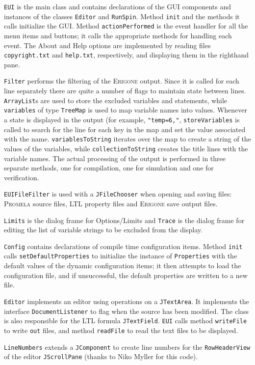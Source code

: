 \documentclass[11pt]{article}
\newcommand{\eri}{\textsc{Erigone}}
\newcommand{\prm}{\textsc{Promela}}
\newcommand{\p}[1]{\texttt{#1}}
\newcommand{\bu}[1]{\textsf{#1}}
\begin{document}
\p{EUI} is the main class and contains declarations of the GUI
components and instances of the classes \p{Editor} and \p{RunSpin}.
Method \p{init} and the methods it calls initialize the GUI. Method
\p{action\-Per\-formed} is the event handler for all the menu items and
buttons; it calls the appropriate methods for handling each event. The
\bu{About} and \bu{Help} options are implemented by reading files
\p{copyright.txt} and \p{help.txt}, respectively, and displaying them in
the righthand pane.

\p{Filter} performs the filtering of the \eri{} output. Since it is
called for each line separately there are quite a number of flags to
maintain state between lines. \p{ArrayList}s are used to store the
excluded variables and statements, while \p{variables} of type
\p{TreeMap} is used to map variable names into values. Whenever a state
is displayed in the output (for example, \p{"temp=6,"},
\p{storeVariables} is called to search for the line for each key in the
map and set the value associated with the name. \p{variablesToString}
iterates over the map to create a string of the values of the variables,
while \p{collectionToString} creates the title lines with the variable
names. The actual processing of the output is performed in three
separate methods, one for compilation, one for simulation and one for
verification.

\p{EUIFileFilter} is used with a \p{JFileChooser} when opening and
saving files: \prm{} source files, LTL property files and \eri{} save
output files.

\p{Limits} is the dialog frame for \bu{Options/Limits} and \p{Trace} is
the dialog frame for editing the list of variable strings to be excluded
from the display.

\p{Config} contains declarations of compile time configuration items.
Method \p{init} calls \p{set\-Default\-Properties} to initialize the
instance of \p{Properties} with the default values of the dynamic
configuration items; it then attempts to load the configuration file,
and if unsuccessful, the default properties are written to a new file.

\p{Editor} implements an editor using operations on a \p{JTextArea}. It
implements the interface \p{Document\-Listener} to flag when the source
has been modified. The class is also responsible for the LTL formula
\p{JTextField}. \p{EUI} calls method \p{writeFile} to write \p{out}
files, and method \p{readFile} to read the text files to be displayed.

\p{LineNumbers} extends a \p{JComponent} to create line numbers for the
\p{RowHeaderView} of the editor \p{JScrollPane} (thanks to Niko Myller
for this code).
\end{document}
